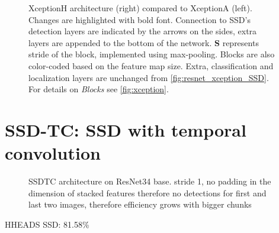 \begin{figure}
    \centering
    \xceptionSSD
    \caption[XceptionH-SSD]%
    {XceptionH architecture (right) compared to XceptionA (left). Changes are highlighted with bold font. Connection to SSD's detection layers are indicated by the arrows on the sides, extra layers are appended to the bottom of the network.  \textbf{S} represents stride of the block, implemented using max-pooling. Blocks are also color-coded based on the feature map size. Extra, classification and localization layers are unchanged from \cref{fig:resnet_xception_SSD}. For details on \textit{Blocks} see \cref{fig:xception}.} 
    \label{fig:xceptionH_SSD}
\end{figure}




\section{SSD-TC: SSD with temporal convolution}
\begin{figure}
    \centering
    \ssdtc
    \caption[SSDTC architecture]{SSDTC architecture on ResNet34 base. stride 1, no padding in the dimension of stacked features therefore no detections for first and last two images, therefore efficiency grows with bigger chunks}
    \label{fig:ssdtc}
\end{figure}


HHEADS SSD: 81.58\%


